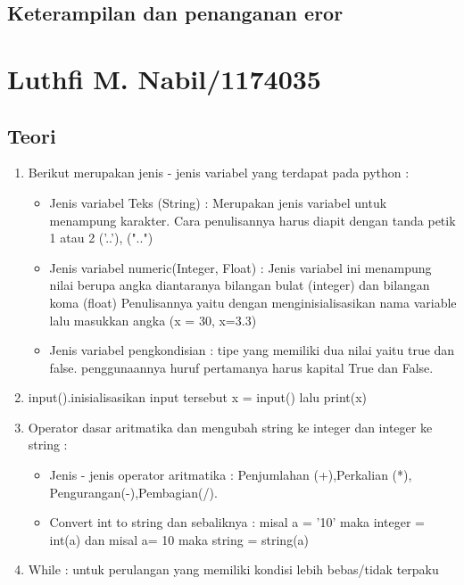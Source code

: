 \begin{enumerate}
\subsection{Keterampilan dan penanganan eror}
    



\section{Luthfi M. Nabil/1174035}
\subsection{Teori}
\begin{enumerate}
	\item Berikut merupakan jenis - jenis variabel yang terdapat pada python : \begin{itemize}	
	\item Jenis variabel Teks (String) : Merupakan jenis variabel untuk menampung karakter. Cara penulisannya harus diapit dengan tanda petik 1 atau 2 ('..'), ("..")

   \item Jenis variabel numeric(Integer, Float) : Jenis variabel ini menampung nilai berupa angka diantaranya bilangan bulat (integer) dan bilangan koma (float)  Penulisannya yaitu dengan menginisialisasikan nama
   variable lalu masukkan angka (x = 30, x=3.3)

   \item Jenis variabel pengkondisian : tipe yang memiliki dua nilai yaitu true dan false. penggunaannya huruf pertamanya harus kapital True dan False.
   \end{itemize}
   \item input().inisialisasikan input tersebut x = input() lalu print(x)

   \item Operator dasar aritmatika dan mengubah string ke integer dan integer ke string : 
\begin{itemize}
\item Jenis - jenis operator aritmatika : Penjumlahan (+),Perkalian (*), Pengurangan(-),Pembagian(/).
\item Convert int to string dan sebaliknya : misal a = '10' maka integer = int(a) dan misal a= 10 maka string = string(a)
\end{itemize}

   \item While : untuk perulangan yang memiliki kondisi lebih bebas/tidak terpaku


\end{enumerate}
\end{enumerate}
